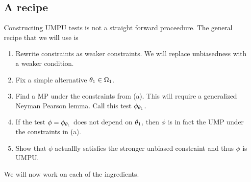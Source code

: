 \subsection{A recipe}
Constructing UMPU tests is not a straight forward proceedure. The general recipe that we will use is
\begin{enumerate}
    \item Rewrite constraints as weaker constraints. We will replace unbiasedness with a weaker condition.
    \item Fix a simple alternative ${\theta}_1 \in {{\Omega}}_1$.
    \item Find a MP under the constraints from (a). This will require a generalized Neyman Pearson lemma. Call this test $\phi_{{\theta}_1}$.
    \item If the test $\phi = \phi_{{\theta}_1}$ does not depend on ${\theta}_1$, then $\phi$ is in fact the UMP under the constraints in (a).
    \item Show that $\phi$ actuallly satisfies the stronger unbiased constraint and thus $\phi$ is UMPU.
\end{enumerate}
We will now work on each of the ingredients.
